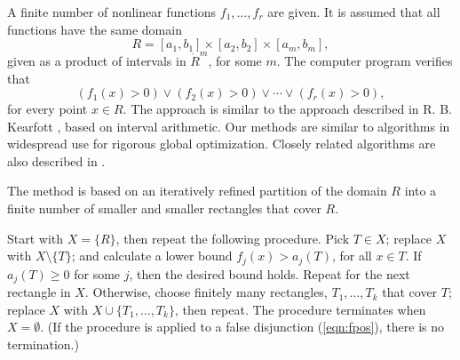 A finite number of nonlinear functions $f_1,\ldots,f_r$ are given.
It is assumed that all functions have the same domain
   $$R= [a_1,b_1] \times [a_2,b_2] \times [a_m,b_m],$$
given as a product of intervals in $\ring{R}^m$, for some $m$.
The computer program verifies that
  \begin{equation}\label{eqn:fpos}
  (f_1(x) >0) \lor (f_2(x) >0) \lor \cdots \lor (f_r(x) >0),
  \end{equation}
for every point $x\in R$.
The approach is similar to the approach described in
R. B. Kearfott \cite{Kea96}, based on interval arithmetic.
Our methods are similar to algorithms in widespread use for
rigorous global optimization.  Closely related algorithms
are also described in \cite{Zu}.

The method is based on an iteratively refined 
partition of the domain  $R$
into a finite number of smaller and smaller rectangles that cover $R$.

Start with $X=\{R\}$,  then repeat the following procedure.
Pick $T\in X$; replace $X$ with $X\setminus\{T\}$; and
calculate a lower bound $f_j(x) > a_j(T)$, 
for all $x\in T$.  If $a_j(T)\ge 0$ for some $j$, then
the desired bound holds.  Repeat for the next rectangle in $X$.
Otherwise, choose finitely many rectangles, $T_1,\ldots,T_k$ that cover $T$;
replace $X$ with $X\cup\{T_1,\ldots,T_k\}$, then repeat.
The procedure terminates when $X=\emptyset$.  (If the procedure
is applied to a false disjunction (\ref{eqn:fpos}), there is no
termination.)



